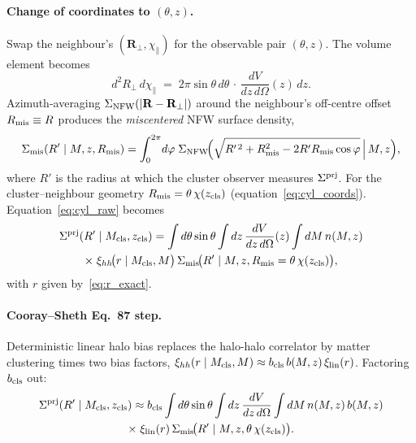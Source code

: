 \documentclass[a4paper, 11pt]{article}
\newcommand{\zcls}{z_{\rm cls}}
\newcommand{\Mcls}{M_{\rm cls}}
\newcommand{\xilin}{\xi_{\rm lin}}
\newcommand{\xihh}{\xi_{hh}}
\newcommand{\bcls}{b_{\rm cls}}
\newcommand{\Sprj}{\Sigma^{\rm prj}}
\newcommand{\Smis}{\Sigma_{\rm mis}}
\newcommand{\Rmis}{R_{\rm mis}}
\newcommand{\dO}{d\Omega}
\newcommand{\chipar}{\chi_\parallel}
\begin{document}
\paragraph{Change of coordinates to \((\theta, z)\).}
Swap the neighbour's \((\mathbf{R}_\perp,\chipar)\) for the
observable pair \((\theta, z)\). The volume element becomes
\begin{equation}
d^2R_\perp\,d\chipar
\;=\; 2\pi\sin\theta\,d\theta \,\cdot\, \frac{dV}{dz\,\dO}(z)\,dz .
\label{eq:volume_element}
\end{equation}
Azimuth-averaging \(\Sigma_{\rm NFW}(|\mathbf{R}-\mathbf{R}_\perp|)\)
around the neighbour's off-centre offset \(\Rmis\equiv R\)
produces the \emph{miscentered} NFW surface density,
\begin{equation}
\Smis(R'\mid M,z,\Rmis)
= \int_0^{2\pi}\!d\varphi\;
  \Sigma_{\rm NFW}\!\Bigl(\sqrt{R'^{\,2}+\Rmis^2-2R'\Rmis\cos\varphi}
  \,\Big|\,M,z\Bigr),
\label{eq:Smis_def}
\end{equation}
where \(R'\) is the radius at which the cluster observer measures
\(\Sprj\). For the cluster--neighbour geometry
\(\Rmis = \theta\,\chi(\zcls)\) (equation~\ref{eq:cyl_coords}).
Equation~\eqref{eq:cyl_raw} becomes
\begin{multline}
\Sprj(R'\mid\Mcls,\zcls) =
\int d\theta\sin\theta\int dz\,\frac{dV}{dz\,\dO}(z)
\int dM\,n(M,z) \\
\times\; \xihh\!\bigl(r\mid\Mcls,M\bigr)\,
\Smis\!\bigl(R'\mid M,z,\Rmis=\theta\,\chi(\zcls)\bigr),
\label{eq:two_halo_cyl}
\end{multline}
with \(r\) given by~\eqref{eq:r_exact}.

\paragraph{Cooray--Sheth Eq.~87 step.}
Deterministic linear halo bias replaces the halo-halo correlator
by matter clustering times two bias factors,
\(\xihh(r\mid\Mcls,M)\approx\bcls\,b(M,z)\,\xilin(r)\).
Factoring \(\bcls\) out:
\begin{multline}
\Sprj(R'\mid\Mcls,\zcls) \approx \bcls
\int d\theta\sin\theta\int dz\,\frac{dV}{dz\,\dO}
\int dM\,n(M,z)\,b(M,z)\\
\times\; \xilin(r)\,\Smis\!\bigl(R'\mid M,z,\theta\,\chi(\zcls)\bigr).
\label{eq:CS87_cyl}
\end{multline}
\end{document}

